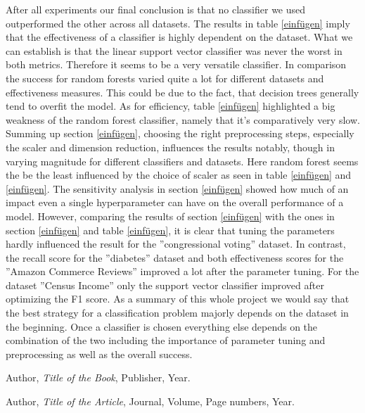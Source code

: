 \documentclass[a4paper,12pt]{article}
\begin{document}
After all experiments our final conclusion is that no classifier we used outperformed the other across all
datasets. The results in table \ref{einfügen} imply that the effectiveness of a classifier is highly dependent on the
dataset. What we can establish is that the linear support vector classifier was never the worst in both
metrics. Therefore it seems to be a very versatile classifier. In comparison the success for random forests
varied quite a lot for different datasets and effectiveness measures. This could be due to the fact, that
decision trees generally tend to overfit the model. As for efficiency, table \ref{einfügen} highlighted a big weakness of
the random forest classifier, namely that it’s comparatively very slow. Summing up section \ref{einfügen}, choosing
the right preprocessing steps, especially the scaler and dimension reduction, influences the results notably,
though in varying magnitude for different classifiers and datasets. Here random forest seems the be the
least influenced by the choice of scaler as seen in table \ref{einfügen} and \ref{einfügen}. The sensitivity analysis in section \ref{einfügen}
showed how much of an impact even a single hyperparameter can have on the overall performance of a
model. However, comparing the results of section \ref{einfügen} with the ones in section \ref{einfügen} and table \ref{einfügen}, it is clear that
tuning the parameters hardly influenced the result for the ”congressional voting” dataset. In contrast, the
recall score for the ”diabetes” dataset and both effectiveness scores for the ”Amazon Commerce Reviews”
improved a lot after the parameter tuning. For the dataset ”Census Income” only the support vector
classifier improved after optimizing the F1 score. As a summary of this whole project we would say that
the best strategy for a classification problem majorly depends on the dataset in the beginning. Once a
classifier is chosen everything else depends on the combination of the two including the importance of
parameter tuning and preprocessing as well as the overall success.


\begin{thebibliography}{9}
Author, \textit{Title of the Book}, Publisher, Year.

Author, \textit{Title of the Article}, Journal, Volume, Page numbers, Year.
\end{thebibliography}
\end{document}
